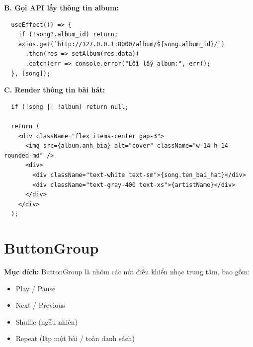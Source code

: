 \begin{enumerate}
  \textbf{B. Gọi API lấy thông tin album:}
  \begin{verbatim}
  useEffect(() => {
    if (!song?.album_id) return;
    axios.get(`http://127.0.0.1:8000/album/${song.album_id}/`)
      .then(res => setAlbum(res.data))
      .catch(err => console.error("Lỗi lấy album:", err));
  }, [song]);
  \end{verbatim}
  
  \textbf{C. Render thông tin bài hát:}
  \begin{verbatim}
  if (!song || !album) return null;
  
  return (
    <div className="flex items-center gap-3">
      <img src={album.anh_bia} alt="cover" className="w-14 h-14 rounded-md" />
      <div>
        <div className="text-white text-sm">{song.ten_bai_hat}</div>
        <div className="text-gray-400 text-xs">{artistName}</div>
      </div>
    </div>
  );
  \end{verbatim}
\end{enumerate}

\section{ButtonGroup}
\textbf{Mục đích:} ButtonGroup là nhóm các nút điều khiển nhạc trung tâm, bao gồm:
\begin{itemize}
  \item Play / Pause
  \item Next / Previous
  \item Shuffle (ngẫu nhiên)
  \item Repeat (lặp một bài / toàn danh sách)
\end{itemize}

